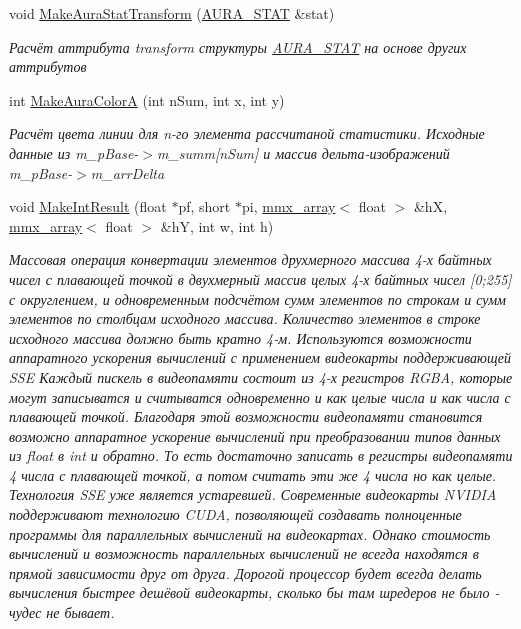 \begin{DoxyCompactItemize}
void \hyperlink{class_c_v_i_engine_thread_a83784b07cdfcd4f006fbfa41aacd4d86}{Make\+Aura\+Stat\+Transform} (\hyperlink{class_a_u_r_a___s_t_a_t}{A\+U\+R\+A\+\_\+\+S\+T\+A\+T} \&stat)
\begin{DoxyCompactList}\small\item\em Расчёт аттрибута transform структуры \hyperlink{class_a_u_r_a___s_t_a_t}{A\+U\+R\+A\+\_\+\+S\+T\+A\+T} на основе других аттрибутов \end{DoxyCompactList}\item 
int \hyperlink{class_c_v_i_engine_thread_a5c5e1e4c1a32d38b39af4547ed4b5827}{Make\+Aura\+Color\+A} (int n\+Sum, int x, int y)
\begin{DoxyCompactList}\small\item\em Расчёт цвета линии для n-\/го элемента рассчитаной статистики. Исходные данные из m\+\_\+p\+Base-\/$>$m\+\_\+summ\mbox{[}n\+Sum\mbox{]} и массив дельта-\/изображений m\+\_\+p\+Base-\/$>$m\+\_\+arr\+Delta \end{DoxyCompactList}\item 
void \hyperlink{class_c_v_i_engine_thread_a77e3066544a8804d4cc5250ac9f4c54b}{Make\+Int\+Result} (float $\ast$pf, short $\ast$pi, \hyperlink{classmmx__array}{mmx\+\_\+array}$<$ float $>$ \&h\+X, \hyperlink{classmmx__array}{mmx\+\_\+array}$<$ float $>$ \&h\+Y, int w, int h)
\begin{DoxyCompactList}\small\item\em Массовая операция конвертации элементов друхмерного массива 4-\/х байтных чисел с плавающей точкой в двухмерный массив целых 4-\/х байтных чисел \mbox{[}0;255\mbox{]} с округлением, и одновременным подсчётом сумм элементов по строкам и сумм элементов по столбцам исходного массива. Количество элементов в строке исходного массива должно быть кратно 4-\/м. Используются возможности аппаратного ускорения вычислений с применением видеокарты поддерживающей S\+S\+E Каждый пискель в видеопамяти состоит из 4-\/х регистров R\+G\+B\+A, которые могут записыватся и считыватся одновременно и как целые числа и как числа с плавающей точкой. Благодаря этой возможности видеопамяти становится возможно аппаратное ускорение вычислений при преобразовании типов данных из float в int и обратно. То есть достаточно записать в регистры видеопамяти 4 числа с плавающей точкой, а потом считать эти же 4 числа но как целые. Технология S\+S\+E уже является устаревшей. Современные видеокарты N\+V\+I\+D\+I\+A поддерживают технологию C\+U\+D\+A, позволяющей создавать полноценные программы для параллельных вычислений на видеокартах. Однако стоимость вычислений и возможность параллельных вычислений не всегда находятся в прямой зависимости друг от друга. Дорогой процессор будет всегда делать вычисления быстрее дешёвой видеокарты, сколько бы там шредеров не было -\/ чудес не бывает. \end{DoxyCompactList}\end{DoxyCompactItemize}
